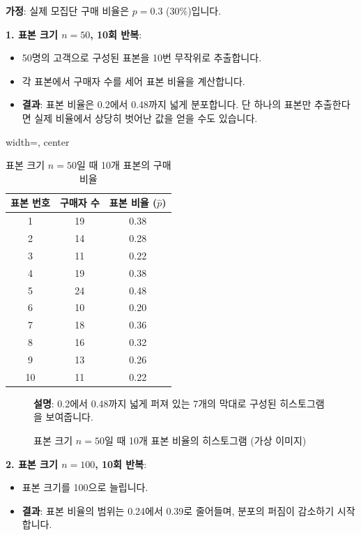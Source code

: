 \documentclass[11pt,a4paper]{book}
\theoremstyle{definition}
\begin{document}
\begin{examplebox}[title={예시: 온라인 광고 구매율 시뮬레이션}]
\textbf{가정}: 실제 모집단 구매 비율은 $p = 0.3$ (30\%)입니다.

\textbf{1. 표본 크기 $n=50$, 10회 반복}:
\begin{itemize}
    \item 50명의 고객으로 구성된 표본을 10번 무작위로 추출합니다.
    \item 각 표본에서 구매자 수를 세어 표본 비율을 계산합니다.
    \item \textbf{결과}: 표본 비율은 0.2에서 0.48까지 넓게 분포합니다. 단 하나의 표본만 추출한다면 실제 비율에서 상당히 벗어난 값을 얻을 수도 있습니다.
\end{itemize}

\begin{table}[h!]
\centering
\caption{표본 크기 $n=50$일 때 10개 표본의 구매 비율}
\label{tab:sample_proportions_n50}
\begin{adjustbox}{width=\textwidth, center}
\begin{tabular}{ccc}
\toprule
\textbf{표본 번호} & \textbf{구매자 수} & \textbf{표본 비율 ($\hat{p}$)} \\
\midrule
1 & 19 & 0.38 \\
2 & 14 & 0.28 \\
3 & 11 & 0.22 \\
4 & 19 & 0.38 \\
5 & 24 & 0.48 \\
6 & 10 & 0.20 \\
7 & 18 & 0.36 \\
8 & 16 & 0.32 \\
9 & 13 & 0.26 \\
10 & 11 & 0.22 \\
\bottomrule
\end{tabular}
\end{adjustbox}
\end{table}

\begin{figure}[h!]
    \centering
    \caption{표본 크기 $n=50$일 때 10개 표본 비율의 히스토그램 (가상 이미지)}
    \label{fig:hist_prop_n50}
    \textbf{설명}: 0.2에서 0.48까지 넓게 퍼져 있는 7개의 막대로 구성된 히스토그램을 보여줍니다.
\end{figure}

\textbf{2. 표본 크기 $n=100$, 10회 반복}:
\begin{itemize}
    \item 표본 크기를 100으로 늘립니다.
    \item \textbf{결과}: 표본 비율의 범위는 0.24에서 0.39로 줄어들며, 분포의 퍼짐이 감소하기 시작합니다.
\end{itemize}


\end{examplebox}
\end{document}
